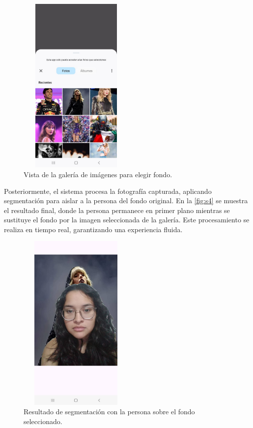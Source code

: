 \documentclass[conference]{IEEEtran}
\begin{document}
\begin{figure}[htbp]
\centering
\includegraphics[width=160pt, height=250pt]{3.png}
\caption{Vista de la galería de imágenes para elegir fondo.}
\label{fig:s3}
\end{figure}

\newpage
Posteriormente, el sistema procesa la fotografía capturada, aplicando segmentación para aislar a la persona del fondo original. En la \textcolor{red}{\autoref{fig:s4}} se muestra el resultado final, donde la persona permanece en primer plano mientras se sustituye el fondo por la imagen seleccionada de la galería. Este procesamiento se realiza en tiempo real, garantizando una experiencia fluida.

\begin{figure}[htbp]
\centering
\includegraphics[width=160pt, height=250pt]{4.png}
\caption{Resultado de segmentación con la persona sobre el fondo seleccionado.}
\label{fig:s4}
\end{figure}
\end{document}
